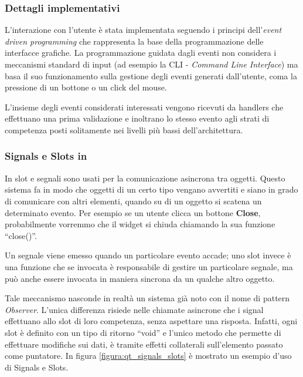 \subsubsection*{Dettagli implementativi}
L'interazione con l'utente è stata implementata seguendo i principi dell'\emph{event driven programming} che rappresenta la base della programmazione delle interfacce grafiche. La programmazione guidata dagli eventi non considera i meccanismi standard di input (ad esempio la CLI - \emph{Command Line Interface}) ma basa il suo funzionamento sulla gestione degli eventi generati dall'utente, coma la pressione di un bottone o un click del mouse. 

L'insieme degli eventi considerati interessati vengono ricevuti da handlers che effettuano una prima validazione e inoltrano lo stesso evento agli strati di competenza posti solitamente nei livelli più bassi dell'architettura.

\subsubsection*{Signals e Slots in \qt{}}
In \qt{} slot e segnali sono usati per la comunicazione asincrona tra oggetti.
Questo sistema fa in modo che oggetti di un certo tipo vengano avvertiti e siano in grado di comunicare con altri elementi, quando su di un oggetto si scatena un determinato evento. Per esempio se un utente clicca un bottone \textbf{Close}, probabilmente vorremmo che il widget si chiuda chiamando la sua funzione ``close()''.

Un segnale viene emesso quando un particolare evento accade; uno slot invece è una funzione che se invocata è responsabile di gestire un particolare segnale, ma può anche essere invocata in maniera sincrona da un qualche altro oggetto.

Tale meccanismo nasconde in realtà un sistema già noto con il nome di pattern \textit{Observer}. L'unica differenza risiede nelle chiamate asincrone che i signal effettuano allo slot di loro competenza, senza aspettare una risposta. Infatti, ogni slot è definito con un tipo di ritorno ``void'' e l'unico metodo che permette di effettuare modifiche sui dati, è tramite effetti collaterali sull'elemento passato come puntatore. In figura \ref{figura:qt_signals_slots} è mostrato un esempio d'uso di Signals e Slots.

